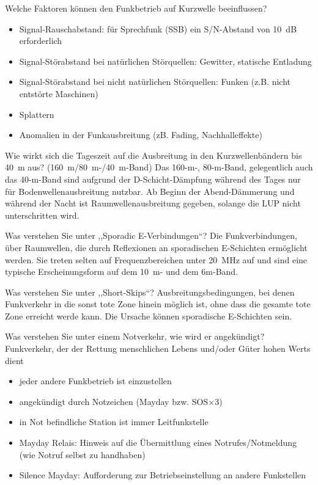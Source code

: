 \documentclass[avery5371,grid,frame,a4paper]{flashcards}
\newcommand{\card}[3]{
  \begin{flashcard}[{\chap} -- #1]{#2}#3\end{flashcard}
}
\begin{document}
\card{29}{Welche Faktoren können den Funkbetrieb auf Kurzwelle beeinflussen?}{
  \small
  \begin{itemize}
    \item Signal-Rauschabstand: für Sprechfunk (SSB) ein S/N-Abstand von \SI{10}{\dB} erforderlich
    \item Signal-Störabstand bei natürlichen Störquellen: Gewitter, statische Entladung
    \item Signal-Störabstand bei nicht natürlichen Störquellen: Funken (z.B. nicht entstörte Maschinen)
    \item Splattern
    \item Anomalien in der Funkausbreitung (zB. Fading, Nachhalleffekte)
  \end{itemize}
}
\card{30}{Wie wirkt sich die Tageszeit auf die Ausbreitung in den Kurzwellenbändern bis \SI{40}{\metre} aus? (\SI{160}{\metre}/\SI{80}{\metre}-/\SI{40}{\metre}-Band)}{
  Das 160-m-, 80-m-Band, gelegentlich auch das 40-m-Band sind aufgrund der D-Schicht-Dämpfung während des Tages nur für Bodenwellenausbreitung nutzbar. Ab Beginn der Abend-Dämmerung und während der Nacht ist Raumwellenausbreitung gegeben, solange die LUP nicht unterschritten wird.
}
\card{31}{Was verstehen Sie unter ,,Sporadic E-Verbindungen``?}{
  Die Funkverbindungen, über Raumwellen, die durch Reflexionen an sporadischen E-Schichten ermöglicht werden. Sie treten selten auf Frequenzbereichen unter \SI{20}{\mega\Hz} auf und sind eine typische Erscheinungsform auf dem \SI{10}{\metre}- und dem 6m-Band.
}
\card{32}{Was verstehen Sie unter ,,Short-Skips``?}{
  Ausbreitungsbedingungen, bei denen Funkverkehr in die sonst tote Zone hinein möglich ist, ohne dass die gesamte tote Zone erreicht werde kann. Die Ursache können sporadische E-Schichten sein.
}
\card{33}{Was verstehen Sie unter einem Notverkehr, wie wird er angekündigt?}{
  \small
  Funkverkehr, der der Rettung menschlichen Lebens und/oder Güter hohen Werts dient
  \begin{itemize}\itemsep1pt
    \item jeder andere Funkbetrieb ist einzustellen
    \item angekündigt durch Notzeichen {\footnotesize (Mayday bzw. SOS$\times 3$)}
    \item in Not befindliche Station ist immer Leitfunkstelle
    \item Mayday Relais: Hinweis auf die Übermittlung eines Notrufes/Notmeldung (wie Notruf selbst zu handhaben)
    \item Silence Mayday: Aufforderung zur Betriebseinstellung an andere Funkstellen
  \end{itemize}
}
\end{document}
